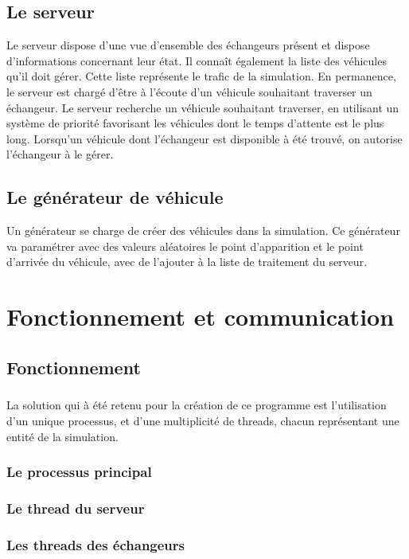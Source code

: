 \documentclass{report}
\begin{document}
	\section{Le serveur}
	Le serveur dispose d'une vue d'ensemble des échangeurs présent et dispose d'informations concernant leur état. Il connaît également la liste des véhicules qu'il doit gérer. Cette liste représente le trafic de la simulation. En permanence, le serveur est chargé d'être à l'écoute d'un véhicule souhaitant traverser un échangeur. Le serveur recherche un véhicule souhaitant traverser, en utilisant un système de priorité favorisant les véhicules dont le temps d'attente est le plus long. Lorsqu'un véhicule dont l'échangeur est disponible à été trouvé, on autorise l'échangeur à le gérer.
	
	\section{Le générateur de véhicule}
	Un générateur se charge de créer des véhicules dans la simulation. Ce générateur va paramétrer avec des valeurs aléatoires le point d'apparition et le point d'arrivée du véhicule, avec de l'ajouter à la liste de traitement du serveur.

\chapter{Fonctionnement et communication}
	
	\section{Fonctionnement}
	\paragraph{}
	La solution qui à été retenu pour la création de ce programme est l'utilisation d'un unique processus, et d'une multiplicité de threads, chacun représentant une entité de la simulation.
	
	\subsection{Le processus principal}
	
	\subsection{Le thread du serveur}
	
	\subsection{Les threads des échangeurs}
	
\end{document}
